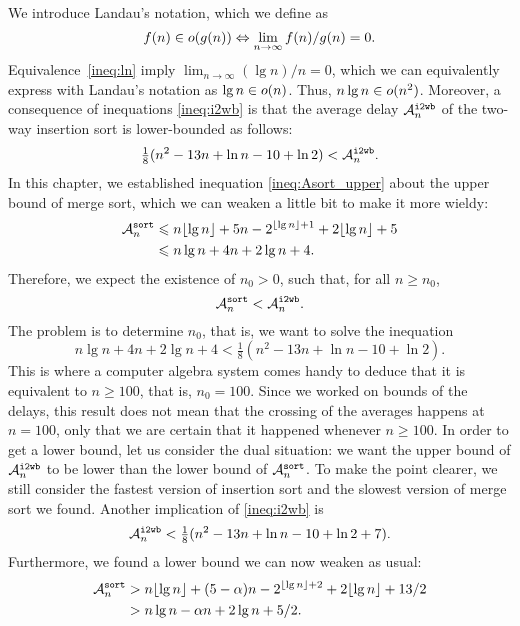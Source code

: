 We introduce Landau's notation, which we define as
\begin{equation}
f(n) \in \landau{g(n)} \Leftrightarrow \lim_{n \rightarrow
  \infty}{f(n)/g(n)} = 0.\label{eq:Landau}
\end{equation}
Equivalence~\eqref{ineq:ln}  imply \(\lim_{n
  \rightarrow \infty}(\lg n)/n = 0\), which we can equivalently
express with Landau's notation as \(\lg n \in \landau{n}\). Thus,
\(n\lg n \in \landau{n^2}\). Moreover, a consequence of inequations
\eqref{ineq:i2wb}  is that the average delay
\(\ave{i2wb}{n}\) of the two\hyp{}way insertion sort is
lower\hyp{}bounded as follows:
\begin{equation*}
\tfrac{1}{8}(n^2 - 13n + \ln n - 10 + \ln 2) < \ave{i2wb}{n}.
\end{equation*}
In this chapter, we established inequation \eqref{ineq:Asort_upper}
 about the upper bound of merge sort, which
we can weaken a little bit to make it more wieldy:
\begin{align*}
\ave{sort}{n} 
&\leqslant n\floor{\lg n} + 5n - 2^{\floor{\lg n}+1}
+ 2\floor{\lg n} + 5\\
&\leqslant n\lg n + 4n + 2\lg n + 4.
\end{align*}
Therefore, we expect the existence of \(n_0 > 0\), such that, for all
\(n \geqslant n_0\),
\[
\ave{sort}{n} < \ave{i2wb}{n}.
\]
The problem is to determine \(n_0\), that is, we want to solve the
inequation
\[
n\lg n + 4n + 2\lg n + 4
< \tfrac{1}{8}(n^2 - 13n + \ln n - 10 + \ln 2).
\]
This is where a computer algebra system comes handy to deduce that it
is equivalent to \(n \geqslant 100\), that is, \(n_0 = 100\). Since we
worked on bounds of the delays, this result does not mean that the
crossing of the averages happens at \(n=100\), only that we are
certain that it happened whenever \(n \geqslant 100\). In order to get
a lower bound, let us consider the dual situation: we want the upper
bound of \(\ave{i2wb}{n}\) to be lower than the lower bound of
\(\ave{sort}{n}\). To make the point clearer, we still consider the
fastest version of insertion sort and the slowest version of merge
sort we found. Another implication of \eqref{ineq:i2wb}
 is
\begin{equation*}
\ave{i2wb}{n} < \tfrac{1}{8}(n^2 - 13n + \ln n - 10 + \ln 2 + 7).
\end{equation*}
Furthermore, we found  a lower bound we can
now weaken as usual:
\begin{align*}
\ave{sort}{n} 
&> n\floor{\lg n} + (5-\alpha)n - 2^{\floor{\lg n}+2}
+ 2\floor{\lg n} + 13/2\\
&> n\lg n - \alpha n + 2\lg n + 5/2.
\end{align*}

